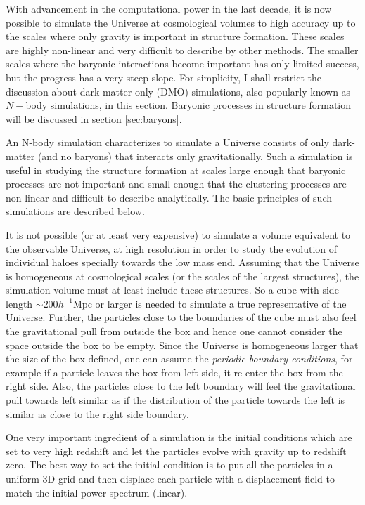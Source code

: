 With advancement in the computational power in the last decade, it is now possible to
simulate the Universe at cosmological volumes to high accuracy up to the scales where
only gravity is important in structure formation. These scales are highly non-linear and
very difficult to describe by other methods. The smaller scales where the baryonic
interactions become important has only limited success, but the progress has a very
steep slope. For simplicity, I shall restrict the discussion about dark-matter only (DMO)
simulations, also popularly known as $N-$body simulations,
in this section. Baryonic processes in structure formation will be 
discussed in section \ref{sec:baryons}.

An N-body simulation
characterizes to simulate a Universe consists of only dark-matter (and no baryons) that 
interacts only gravitationally. Such a simulation is useful in studying the
structure formation at scales large enough that baryonic processes are not 
important and small enough that the clustering processes are non-linear and difficult
to describe analytically. The basic principles of such simulations are described below.

It is not possible (or at least very expensive) to simulate a volume equivalent to the
observable Universe, at high resolution in order to study the evolution of individual
haloes specially towards the low mass end. Assuming that the Universe is homogeneous
at cosmological scales (or the scales of the largest structures), the simulation
volume must at least include these structures. So a cube with side length $\sim 200h^{-1} \mathrm{Mpc}$
or larger is needed to simulate a true representative of the Universe. Further, the
particles close to the boundaries of the cube must also feel the gravitational pull
from outside the box and hence one cannot consider the space outside the box to be 
empty. Since the Universe is homogeneous larger that the size of the box defined, one
can assume the {\it periodic boundary conditions}, for example if a particle leaves the box from left
side, it re-enter the box from the right side. Also, the particles close to the left boundary
will feel the gravitational pull towards left similar as if the distribution of the particle
towards the left is similar as close to the right side boundary.

One very important ingredient of a simulation is the initial conditions which are
set to very high redshift and let the particles evolve with gravity up to redshift zero. 
The best way to set the initial condition is to put all the particles in a uniform 3D grid
and then displace each particle with a displacement field to match the initial power 
spectrum (linear). 

